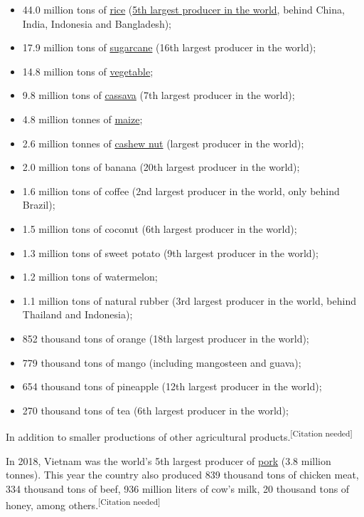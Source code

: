\documentclass{article}
\begin{document}
\begin{itemize}
    \item 44.0 million tons of \href{https://en.wikipedia.org/wiki/Rice}{rice} (\href{https://en.wikipedia.org/wiki/Rice_production_in_Vietnam}{5th largest producer in the world}, behind China, India, Indonesia and Bangladesh);
    \item 17.9 million tons of \href{https://en.wikipedia.org/wiki/Sugarcane}{sugarcane} (16th largest producer in the world);
    \item 14.8 million tons of \href{https://en.wikipedia.org/wiki/Vegetable}{vegetable};
    \item 9.8 million tons of \href{https://en.wikipedia.org/wiki/Cassava}{cassava} (7th largest producer in the world);
    \item 4.8 million tonnes of \href{https://en.wikipedia.org/wiki/Maize}{maize};
    \item 2.6 million tonnes of \href{https://en.wikipedia.org/wiki/Cashew_nut}{cashew nut} (largest producer in the world);
    \item 2.0 million tons of banana (20th largest producer in the world);
    \item 1.6 million tons of coffee (2nd largest producer in the world, only behind Brazil);
    \item 1.5 million tons of coconut (6th largest producer in the world);
    \item 1.3 million tons of sweet potato (9th largest producer in the world);
    \item 1.2 million tons of watermelon;
    \item 1.1 million tons of natural rubber (3rd largest producer in the world, behind Thailand and Indonesia);
    \item 852 thousand tons of orange (18th largest producer in the world);
    \item 779 thousand tons of mango (including mangosteen and guava);
    \item 654 thousand tons of pineapple (12th largest producer in the world);
    \item 270 thousand tons of tea (6th largest producer in the world);
\end{itemize}

In addition to smaller productions of other agricultural products.\textsuperscript{[Citation needed]}

In 2018, Vietnam was the world's 5th largest producer of \href{https://en.wikipedia.org/wiki/Pork}{pork} (3.8 million tonnes). This year the country also produced 839 thousand tons of chicken meat, 334 thousand tons of beef, 936 million liters of cow's milk, 20 thousand tons of honey, among others.\textsuperscript{[Citation needed]}
\end{document}
